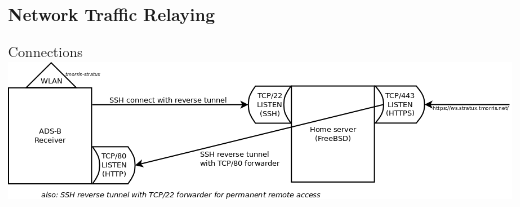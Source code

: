 \begin{frame}
\frametitle{Network Traffic Relaying}
\begin{block}{Connections}
\includegraphics{image/adsb-networking.png}



\end{block}
\end{frame}
